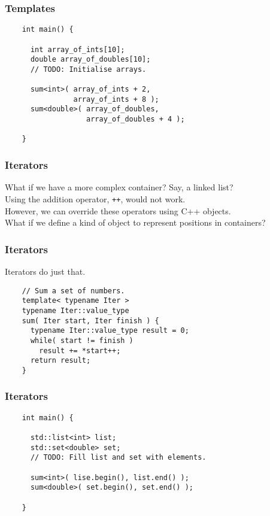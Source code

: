 \begin{frame}[fragile]
  \frametitle{Templates}
  \begin{example}
    \begin{lstlisting}
    int main() {

      int array_of_ints[10];
      double array_of_doubles[10];
      // TODO: Initialise arrays.

      sum<int>( array_of_ints + 2,
                array_of_ints + 8 );
      sum<double>( array_of_doubles,
                   array_of_doubles + 4 );

    }
    \end{lstlisting}
  \end{example}
\end{frame}

\begin{frame}[fragile]
  \frametitle{Iterators}
  What if we have a more complex container? Say, a linked list? \\
  Using the addition operator, \lstinline|++|, would not work. \\
  However, we can override these operators using C++ objects. \\
  What if we define a kind of object to represent positions in
  containers?
\end{frame}

\begin{frame}[fragile]
  \frametitle{Iterators}
  Iterators do just that.
  \begin{example}
    \begin{lstlisting}
    // Sum a set of numbers.
    template< typename Iter >
    typename Iter::value_type
    sum( Iter start, Iter finish ) {
      typename Iter::value_type result = 0;
      while( start != finish )
        result += *start++;
      return result;
    }
    \end{lstlisting}
  \end{example}
\end{frame}

\begin{frame}[fragile]
  \frametitle{Iterators}
  \begin{example}
    \begin{lstlisting}
    int main() {

      std::list<int> list;
      std::set<double> set;
      // TODO: Fill list and set with elements.

      sum<int>( lise.begin(), list.end() );
      sum<double>( set.begin(), set.end() );

    }
    \end{lstlisting}
  \end{example}
\end{frame}

